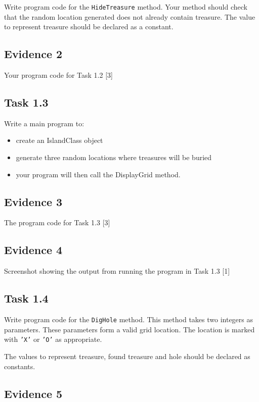 Write program code for the \texttt{HideTreasure} method. Your method
should check that the random location generated does not already contain
treasure. The value to represent treasure should be declared as a
constant. 

\subsection*{Evidence 2 }

Your program code for Task 1.2\hfill{} {[}3{]}

\subsection*{Task 1.3 }

Write a main program to: 
\begin{itemize}
\item create an IslandClass object 
\item generate three random locations where treasures will be buried
\item your program will then call the DisplayGrid method. 
\end{itemize}

\subsection*{Evidence 3 }

The program code for Task 1.3 \hfill{}{[}3{]}

\subsection*{Evidence 4}

Screenshot showing the output from running the program in Task 1.3\hfill{}
{[}1{]}

\subsection*{Task 1.4 }

Write program code for the \texttt{DigHole} method. This method takes
two integers as parameters. These parameters form a valid grid location.
The location is marked with \texttt{'X'} or \texttt{'O'} as appropriate. 

The values to represent treasure, found treasure and hole should be
declared as constants. 

\subsection*{Evidence 5}

